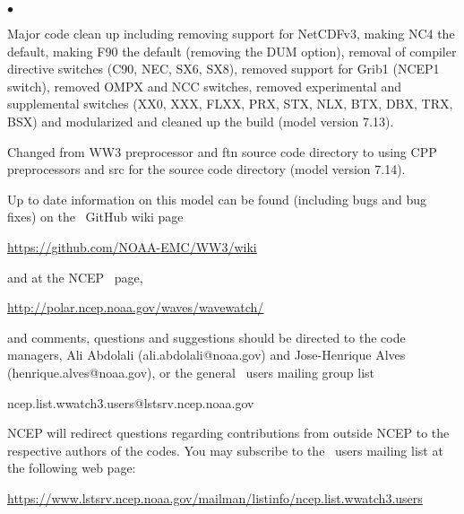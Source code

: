 \begin{list}{$\bullet$}{\rightmargin 5mm \parsep 0mm \itemsep 0mm}
\item Major code clean up including removing support for NetCDFv3, making NC4 the default, 
      making F90 the default (removing the DUM option), removal of compiler directive 
      switches (C90, NEC, SX6, SX8), removed support for Grib1 (NCEP1 switch), removed OMPX 
      and NCC switches, removed experimental and supplemental switches (XX0, XXX, FLXX, PRX, 
      STX, NLX, BTX, DBX, TRX, BSX) and modularized and cleaned up the build (model version 7.13).

\item Changed from WW3 preprocessor and ftn source code directory to using CPP preprocessors and
      src for the source code directory (model version 7.14).  

\end{list}

\vspace{\baselineskip} \noindent 
Up to date information on this model can be found (including bugs and bug
fixes) on the \ws\ GitHub wiki page
\begin{center}
\url{https://github.com/NOAA-EMC/WW3/wiki}
\end{center}
and at the NCEP \ws\ page, 
\begin{center}
\url{http://polar.ncep.noaa.gov/waves/wavewatch/}
\end{center}
and comments, questions and suggestions should be
directed to the code managers, Ali Abdolali (ali.abdolali@noaa.gov) and Jose-Henrique Alves (henrique.alves@noaa.gov), or the general \ws\ users mailing group list

\begin{center}
ncep.list.wwatch3.users@lstsrv.ncep.noaa.gov
\end{center}

\noindent
NCEP will redirect questions regarding contributions from outside NCEP to the
respective authors of the codes. You may subscribe to the \ws\ users 
mailing list at the following web page:
\begin{center}
\footnotesize
\url{https://www.lstsrv.ncep.noaa.gov/mailman/listinfo/ncep.list.wwatch3.users}
\end{center} 

\nocite{tol:OMOD02b}
\nocite{tol:PACO02}
\nocite{tol:GAOS02}
\nocite{tol:OMB02b}
\nocite{tol:OMB02c}
